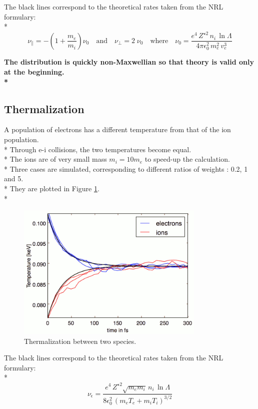 \documentclass[11pt]{article}
\begin{document}
The black lines correspond to the theoretical rates taken from the NRL formulary:\\*
\begin{equation*}
\nu_\| = -\left(1+\frac{m_e}{m_i}\right)\nu_0 \quad\textrm{and}\quad \nu_\perp = 2\;\nu_0 \quad\textrm{where}\quad \nu_0=\frac{e^4\,Z^{\star 2}\,n_i\,\ln\Lambda } { 4 \pi \epsilon_0^2 \,m_e^2\,v_e^3 }
\end{equation*}

\textbf{The distribution is quickly non-Maxwellian so that theory is valid only at the beginning.\\*}

\clearpage
\subsection{Thermalization}
A population of electrons has a different temperature from that of the ion population.\\*
Through e-i collisions, the two temperatures become equal.\\*
The ions are of very small mass $m_i=10 m_e$ to speed-up the calculation.\\*
Three cases are simulated, corresponding to different ratios of weights : 0.2, 1 and 5.\\*
They are plotted in Figure \ref{thermalization}.\\*

\begin{figure}[h]
\centering
\includegraphics[width=9cm]{thermalisation_ei123}
\caption{Thermalization between two species.}
\label{thermalization}
\end{figure}

The black lines correspond to the theoretical rates taken from the NRL formulary:\\*
\begin{equation*}
\nu_\epsilon=\frac{e^4\,Z^{\star 2} \sqrt{m_em_i}\,n_i\,\ln\Lambda } { 8 \epsilon_0^2 \,\left(m_eT_e+m_iT_i\right)^{3/2} }
\end{equation*}
\end{document}
